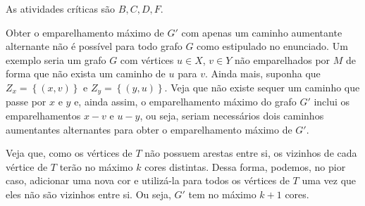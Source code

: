 \documentclass[a4paper]{report}
\begin{document}
As atividades críticas são $B, C, D, F $.


Obter o emparelhamento máximo de $G'$ com apenas um caminho aumentante alternante não é possível para todo grafo $G$ como estipulado no enunciado. Um exemplo seria um grafo $G$ com vértices $u\in X$, $v\in Y$ não emparelhados por $M$ de forma que não exista um caminho de $u$ para $v$. Ainda mais, suponha que $Z_x = \left\{ \left( x,v \right)  \right\} $ e $Z_y = \left\{ \left( y,u \right)  \right\} $. Veja que não existe sequer um caminho que passe por $x$ e $y$ e, ainda assim, o emparelhamento máximo do grafo $G'$ inclui os emparelhamentos $x-v$ e $u-y$, ou seja, seriam necessários dois caminhos aumentantes alternantes para obter o emparelhamento máximo de $G'$.


Veja que, como os vértices de $T$ não possuem arestas entre si, os vizinhos de cada vértice de $T$ terão no máximo $k$ cores distintas. Dessa forma, podemos, no pior caso, adicionar uma nova cor e utilizá-la para todos os vértices de $T$ uma vez que eles não são vizinhos entre si. Ou seja, $G'$ tem no máximo $k+1$ cores.
\end{document}
